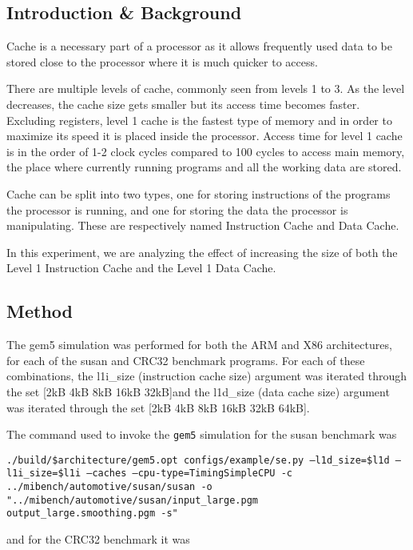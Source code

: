 
\subsection{Introduction \& Background}

Cache is a necessary part of a processor as it allows frequently used data to be stored
close to the processor where it is much quicker to access.

There are multiple levels of cache, commonly seen from levels 1 to 3.
As the level decreases, the cache size gets smaller but its access time becomes faster.
Excluding registers, level 1 cache is the fastest type of memory and in order to maximize
its speed it is placed inside the processor.
Access time for level 1 cache is in the order of 1-2 clock cycles compared to 100 cycles
to access main memory, the place where currently running programs and all the working 
data are stored.

Cache can be split into two types, one for storing instructions of the programs the 
processor is running, and one for storing the data the processor is manipulating.
These are respectively named Instruction Cache and Data Cache.

In this experiment, we are analyzing the effect of increasing the size of both the 
Level 1 Instruction Cache and the Level 1 Data Cache.

\subsection{Method}

The gem5 simulation was performed for both the ARM and X86 architectures, for
each of the susan and CRC32 benchmark programs. 
For each of these combinations, the l1i\_size (instruction cache size) argument was 
iterated through the set [2kB 4kB 8kB 16kB 32kB]and the l1d\_size (data cache size) 
argument was iterated through the set [2kB 4kB 8kB 16kB 32kB 64kB].

The command used to invoke the \texttt{gem5} simulation for the susan benchmark was

\texttt{./build/\${architecture}/gem5.opt configs/example/se.py --l1d\_size=\${l1d} --l1i\_size=\${l1i} --caches --cpu-type=TimingSimpleCPU -c ../mibench/automotive/susan/susan -o "../mibench/automotive/susan/input\_large.pgm output\_large.smoothing.pgm -s"}

and for the CRC32 benchmark it was

